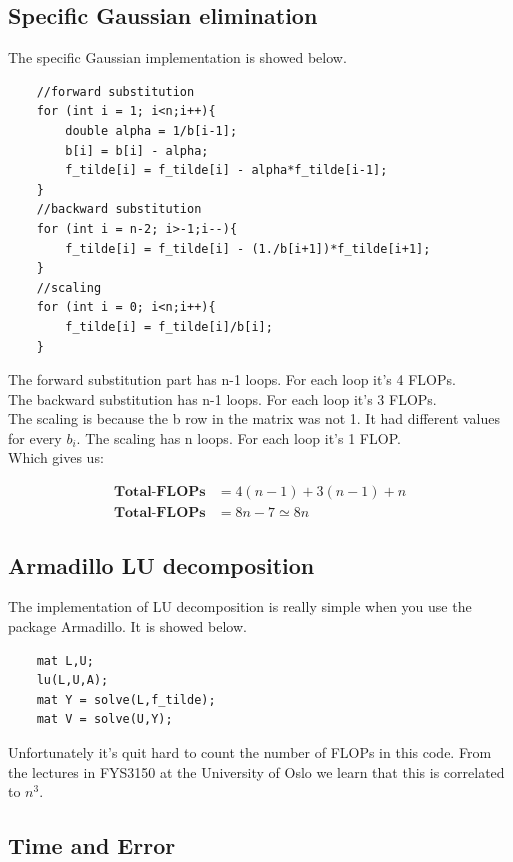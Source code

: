 \documentclass[12pt,norsk,a4paper]{article}
\begin{document}
\subsection{Specific Gaussian elimination}

The specific Gaussian implementation is showed below. 
\begin{lstlisting}
    //forward substitution
    for (int i = 1; i<n;i++){
        double alpha = 1/b[i-1];
        b[i] = b[i] - alpha;
        f_tilde[i] = f_tilde[i] - alpha*f_tilde[i-1];
    }
    //backward substitution
    for (int i = n-2; i>-1;i--){
        f_tilde[i] = f_tilde[i] - (1./b[i+1])*f_tilde[i+1];
    }
    //scaling
    for (int i = 0; i<n;i++){
        f_tilde[i] = f_tilde[i]/b[i];
    }
\end{lstlisting}

The forward substitution part has n-1 loops. For each loop it's 4 FLOPs. \\
The backward substitution has n-1 loops. For each loop it's 3 FLOPs. \\
The scaling is because the b row in the matrix was not 1. It had different values for every $b_i$. The scaling has n loops. For each loop it's 1 FLOP. \\
Which gives us: 

\begin{align*}
\textbf{Total-FLOPs} &= 4(n-1) + 3(n-1) + n
\\ 
\textbf{Total-FLOPs} &= 8n - 7 \simeq 8n
\end{align*}


\subsection{Armadillo LU decomposition}

The implementation of LU decomposition is really simple when you use the package Armadillo. It is showed below.
\begin{lstlisting}
    mat L,U;
    lu(L,U,A);
    mat Y = solve(L,f_tilde);
    mat V = solve(U,Y);
\end{lstlisting}

Unfortunately it's quit hard to count the number of FLOPs in this code. From the lectures in FYS3150 at the University of Oslo we learn that this is correlated to $n^3$.

\subsection{Time and Error}
\end{document}
